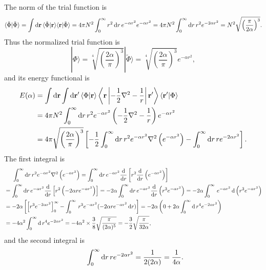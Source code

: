 \documentclass[a4paper]{book}
\newcounter{solution}[chapter]
\newcommand*{\dif}{\mathop{}\!\mathrm{d}}
\newcommand{\bfr}{{\bf r}}
\begin{document}
	\begin{solution}
	
	The norm of the trial function is
	\[
		\langle \tilde{\Phi} | \tilde{\Phi} \rangle = \int \dif \bfr \, \langle \tilde{\Phi} | \bfr \rangle \langle \bfr | \tilde{\Phi} \rangle = 4 \pi N^2 \int_0^{\infty} r^2 \dif r \, e^{-\alpha r^2} e^{-\alpha r^2} = 4 \pi N^2 \int_0^{\infty} \dif r \, r^2 e^{-2\alpha r^2} = N^2 \sqrt{ \left( \frac{\pi}{2\alpha} \right)^3 } .
	\]
	Thus the normalized trial function is
	\[
		| \Phi \rangle = \sqrt[4]{ \left( \frac{2\alpha}{\pi} \right)^3 } | \tilde{\Phi} \rangle = \sqrt[4]{ \left( \frac{2\alpha}{\pi} \right)^3 } e^{- \alpha r^2} ,
	\]
	and its energy functional is
	\begin{align*}
		E( \alpha ) &= \int \dif \bfr \int \dif \bfr^\prime \, \langle \Phi | \bfr \rangle \left\langle \bfr \left| -\frac 12 \nabla^2 - \frac{1}{r} \right| \bfr^\prime \right\rangle \langle \bfr^\prime | \Phi \rangle \\
		&= 4\pi N^2 \int_0^\infty \dif r \, r^2 e^{- \alpha r^2}  \left( -\frac 12 \nabla^2 - \frac{1}{r} \right) e^{- \alpha r^2}   \\
		&= 4\pi \sqrt{ \left( \frac{2\alpha}{\pi} \right)^3 } \left[ -\frac{1}{2} \int_0^\infty \dif r \, r^2 e^{- \alpha r^2} \nabla^2 \left( e^{- \alpha r^2} \right) - \int_0^\infty \dif r \, r e^{- 2 \alpha r^2} \right] .
	\end{align*}
	The first integral is
	\begin{align*}
		&\hspace{1.4em}\int_0^\infty \dif r \, r^2 e^{- \alpha r^2} \nabla^2 \left( e^{- \alpha r^2} \right) = \int_0^\infty \dif r \, e^{- \alpha r^2} \frac{ \dif }{ \dif r } \left[ r^2 \frac{ \dif }{ \dif r } \left( e^{- \alpha r^2} \right) \right] \\
		&= \int_0^\infty \dif r \, e^{- \alpha r^2} \frac{ \dif }{ \dif r } \left[ r^2 \left( -2 \alpha r e^{- \alpha r^2} \right) \right] = - 2 \alpha \int_0^\infty \dif r \, e^{- \alpha r^2} \frac{ \dif }{ \dif r } \left( r^3 e^{- \alpha r^2} \right) = - 2\alpha \int_0^\infty \, e^{- \alpha r^2} \dif \left( r^3 e^{- \alpha r^2} \right)  \\
		&= -2 \alpha \left[ \left[ r^3 e^{- 2\alpha r^2} \right]^\infty_0 - \int_0^\infty \, r^3 e^{- \alpha r^2} ( -2\alpha r e^{- \alpha r^2} \dif r ) \right] = -2 \alpha \left( 0 + 2\alpha \int_0^\infty \dif \, r^4 e^{-2\alpha r^2} \right) \\
		&= -4 \alpha^2 \int_0^\infty \dif \, r^4 e^{-2\alpha r^2} = -4 \alpha^2 \times \frac{3}{8} \sqrt{ \frac{ \pi }{ ( 2\alpha )^5 } } = - \frac{3}{2} \sqrt{ \frac{ \pi }{ 32 \alpha } } ,
	\end{align*}
	and the second integral is
	\begin{align*}
		&\hspace{1.4em} \int_0^\infty \dif r \, r e^{- 2 \alpha r^2} = \frac{1}{2(2\alpha)} = \frac{1}{4\alpha} .
	\end{align*}
	

\end{solution}
\end{document}
